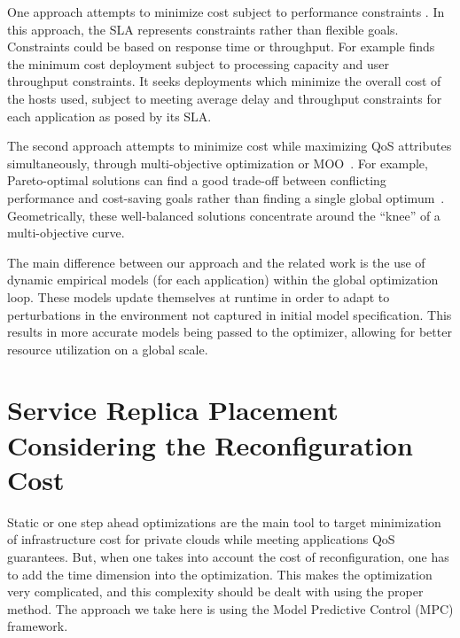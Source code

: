 One approach attempts to minimize cost subject to performance constraints
\cite{li_fast_2009,li_performance_2009}. In this approach, the SLA represents constraints rather than flexible goals. Constraints could be based on response time or throughput. For example \cite{li_fast_2009} finds the minimum cost deployment subject to processing capacity and user throughput constraints. It seeks deployments which minimize the overall cost of the hosts used, subject to meeting average delay and throughput constraints for each application as posed by its SLA. 

The second approach attempts to minimize cost while maximizing QoS attributes simultaneously, through multi-objective optimization or
MOO~\cite{li_sla-driven_2010}. For example, Pareto-optimal solutions can find a good trade-off between conflicting performance and cost-saving goals rather than finding a single global optimum~\cite{soror_automatic_2010}. Geometrically, these well-balanced solutions concentrate around the ``knee'' of a multi-objective curve.

The main difference between our approach and the related work is the use of dynamic empirical models (for each application) within the global optimization loop. These models update themselves at runtime in order to adapt to perturbations in the environment not captured in initial model specification.  This results in more accurate models being passed to the optimizer, allowing for better resource utilization on a global scale.  

    
\section{Service Replica Placement Considering the Reconfiguration Cost} 
\label{sec:service_replica_placement_considering_trhing_cost} 
 Static or one step ahead optimizations are the main tool to target minimization of infrastructure cost for private clouds while meeting applications QoS guarantees. But, when one takes into account the cost of reconfiguration, one has to add the time dimension into the optimization. This makes the optimization very complicated, and this complexity should be dealt with using the proper method. The approach we take here is using the Model Predictive Control (MPC) framework.  

